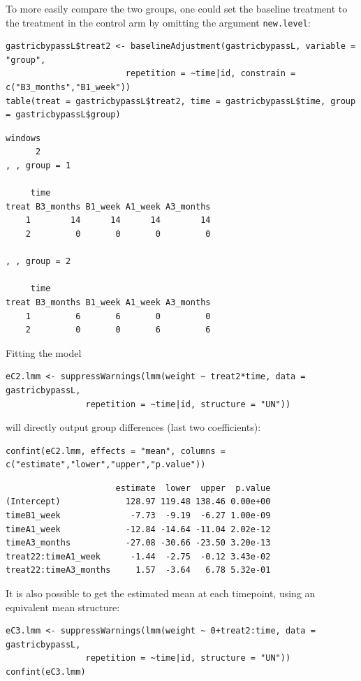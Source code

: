 \documentclass[12pt]{article}
\begin{document}
To more easily compare the two groups, one could set the baseline
treatment to the treatment in the control arm by omitting the argument
\texttt{new.level}:
\lstset{language=r,label= ,caption= ,captionpos=b,numbers=none}
\begin{lstlisting}
gastricbypassL$treat2 <- baselineAdjustment(gastricbypassL, variable = "group",
					    repetition = ~time|id, constrain = c("B3_months","B1_week"))
table(treat = gastricbypassL$treat2, time = gastricbypassL$time, group = gastricbypassL$group)
\end{lstlisting}

\begin{verbatim}
windows 
      2
, , group = 1

     time
treat B3_months B1_week A1_week A3_months
    1        14      14      14        14
    2         0       0       0         0

, , group = 2

     time
treat B3_months B1_week A1_week A3_months
    1         6       6       0         0
    2         0       0       6         6
\end{verbatim}

Fitting the model
\lstset{language=r,label= ,caption= ,captionpos=b,numbers=none}
\begin{lstlisting}
eC2.lmm <- suppressWarnings(lmm(weight ~ treat2*time, data = gastricbypassL,
				repetition = ~time|id, structure = "UN"))
\end{lstlisting}

will directly output group differences (last two coefficients):
\lstset{language=r,label= ,caption= ,captionpos=b,numbers=none}
\begin{lstlisting}
confint(eC2.lmm, effects = "mean", columns = c("estimate","lower","upper","p.value"))
\end{lstlisting}
\begin{verbatim}
                      estimate  lower  upper  p.value
(Intercept)             128.97 119.48 138.46 0.00e+00
timeB1_week              -7.73  -9.19  -6.27 1.00e-09
timeA1_week             -12.84 -14.64 -11.04 2.02e-12
timeA3_months           -27.08 -30.66 -23.50 3.20e-13
treat22:timeA1_week      -1.44  -2.75  -0.12 3.43e-02
treat22:timeA3_months     1.57  -3.64   6.78 5.32e-01
\end{verbatim}


It is also possible to get the estimated mean at each timepoint, using
an equivalent mean structure:
\lstset{language=r,label= ,caption= ,captionpos=b,numbers=none}
\begin{lstlisting}
eC3.lmm <- suppressWarnings(lmm(weight ~ 0+treat2:time, data = gastricbypassL,
				repetition = ~time|id, structure = "UN"))
confint(eC3.lmm)
\end{lstlisting}
\end{document}
